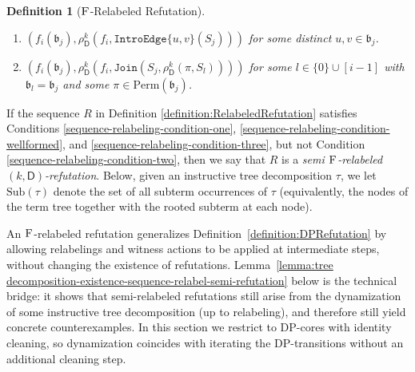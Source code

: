 \documentclass[11pt,a4paper]{article}
\newtheorem{definition}[theorem]{Definition}
\newcommand{\treewidthvalue}{k}
\newcommand{\abag}{\mathfrak{b}}
\newcommand{\allsubterms}{\mathrm{Sub}}
\newcommand{\jointype}{\mathtt{Join}}
\newcommand{\introedgegeneric}[2]{\mathtt{IntroEdge}\{#1,#2\}}
\newcommand{\abstractdecomposition}{\tau}
\newcommand{\vertexone}{u}
\newcommand{\vertextwo}{v}
\newcommand{\dpcore}{\mathsf{D}}
\newcommand{\witnessset}{S}
\newcommand{\dprefutation}{R}
\newcommand{\relabelingfunction}{f}
\newcommand{\action}{\rho}
\newcommand{\relabelsequence}{\textsc{F}}
\begin{document}
\begin{definition}[$\relabelsequence$-Relabeled Refutation]
\begin{enumerate}
\begin{enumerate}
for some $\vertexone\in \abag_j$.
\item \label{sequence-relabelinn-IntroEdge}
$(\relabelingfunction_i(\abag_j), \action_{\dpcore}^{\treewidthvalue}(\relabelingfunction_i,\introedgegeneric{\vertexone}{\vertextwo}(\witnessset_j)))$
 for some distinct $\vertexone,\vertextwo\in \abag_j$.
	\item \label{sequence-relabeling-Join}
	$(\relabelingfunction_i(\abag_j), \action_{\dpcore}^{\treewidthvalue}(\relabelingfunction_i,\jointype(\witnessset_j,\action_{\dpcore}^{\treewidthvalue}(\pi,\witnessset_l))))$
	for some $l\in \{0\}\cup[i-1]$ with $\abag_l=\abag_j$ and some $\pi\in \mathrm{Perm}(\abag_j)$.

		\end{enumerate}
		\end{enumerate}
		\end{definition}


	If the sequence $\dprefutation$ in Definition \ref{definition:RelabeledRefutation} satisfies Conditions
	\ref{sequence-relabeling-condition-one}, \ref{sequence-relabeling-condition-wellformed}, and \ref{sequence-relabeling-condition-three}, but not Condition
	\ref{sequence-relabeling-condition-two}, then we say that $\dprefutation$ is a \emph{semi $\relabelsequence$-relabeled $(\treewidthvalue,\dpcore)$-refutation}.
Below, given an instructive tree decomposition $\abstractdecomposition$, we let
$\allsubterms(\abstractdecomposition)$ denote the set of all subterm occurrences of $\abstractdecomposition$ (equivalently, the nodes of the term tree together with the rooted subterm at each node).


An $\relabelsequence$-relabeled refutation generalizes Definition~\ref{definition:DPRefutation} by allowing relabelings and witness actions to be applied at intermediate steps, without changing the existence of refutations. Lemma~\ref{lemma:tree decomposition-existence-sequence-relabel-semi-refutation} below is the technical bridge: it shows that semi-relabeled refutations still arise from the dynamization of some instructive tree decomposition (up to relabeling), and therefore still yield concrete counterexamples. In this section we restrict to DP-cores with identity cleaning, so dynamization coincides with iterating the DP-transitions without an additional cleaning step.
\end{document}
